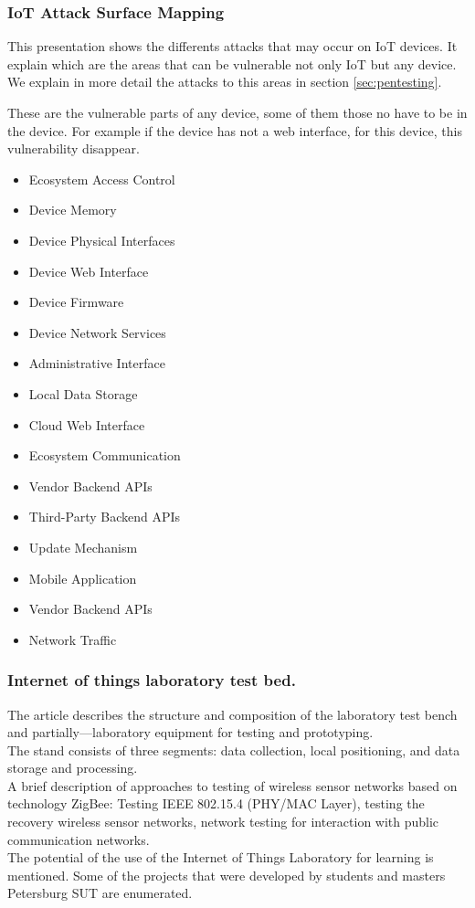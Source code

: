 \subsubsection{IoT Attack Surface Mapping}\cite{Presentation1}
This presentation shows the differents attacks that may occur on IoT devices. It explain which are the areas that can be vulnerable not only IoT but any device. We explain in more detail the attacks to this areas in section \ref{sec:pentesting}.

These are the vulnerable parts of any device, some of them those no have to be in the device. For example if the device has not a web interface, for this device, this vulnerability disappear.
\begin{itemize}
	\item Ecosystem Access Control
	\item Device Memory
	\item Device Physical Interfaces
	\item Device Web Interface
	\item Device Firmware
	\item Device Network Services
	\item Administrative Interface
	\item Local Data Storage
	\item Cloud Web Interface
	\item Ecosystem Communication
	\item Vendor Backend APIs
	\item Third-Party Backend APIs
	\item Update Mechanism
	\item Mobile Application
	\item Vendor Backend APIs
	\item Network Traffic
\end{itemize}

\subsubsection{Internet of things laboratory test bed.}\cite{Paper12}
The article describes the structure and composition of the laboratory test bench and partially—laboratory equipment for testing and prototyping.\\
The stand consists of three segments: data collection, local positioning, and data storage and processing.\\
A brief description of approaches to testing of wireless sensor networks based on technology ZigBee: Testing IEEE 802.15.4 (PHY/MAC Layer), testing the recovery wireless sensor networks, network testing for interaction with public communication networks.\\
The potential of the use of the Internet of Things Laboratory for learning is mentioned. Some of the projects that were developed by students and masters Petersburg SUT are enumerated.\\

